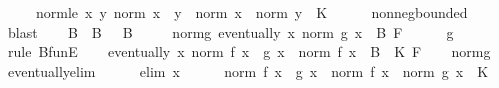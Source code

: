 \begin{isabellebody}
\ \ \ \ \ norm{\isacharunderscore}{\kern0pt}le{\isacharcolon}{\kern0pt}\ {\isachardoublequoteopen}{\isasymAnd}x\ y{\isachardot}{\kern0pt}\ norm\ {\isacharparenleft}{\kern0pt}x\ {\isacharasterisk}{\kern0pt}{\isacharasterisk}{\kern0pt}\ y{\isacharparenright}{\kern0pt}\ {\isasymle}\ norm\ x\ {\isacharasterisk}{\kern0pt}\ norm\ y\ {\isacharasterisk}{\kern0pt}\ K{\isachardoublequoteclose}\isanewline
\ \ \ \ \isamarkupfalse%
\ nonneg{\isacharunderscore}{\kern0pt}bounded\ \isamarkupfalse%
\ blast\isanewline
\ \ \isamarkupfalse%
\ B\ \ B{\isacharcolon}{\kern0pt}\ {\isachardoublequoteopen}{}\ {\isacharless}{\kern0pt}\ B{\isachardoublequoteclose}\isanewline
\ \ \ \ \ norm{\isacharunderscore}{\kern0pt}g{\isacharcolon}{\kern0pt}\ {\isachardoublequoteopen}eventually\ {\isacharparenleft}{\kern0pt}{\isasymlambda}x{\isachardot}{\kern0pt}\ norm\ {\isacharparenleft}{\kern0pt}g\ x{\isacharparenright}{\kern0pt}\ {\isasymle}\ B{\isacharparenright}{\kern0pt}\ F{\isachardoublequoteclose}\isanewline
\ \ \ \ \isamarkupfalse%
\ g\ \isamarkupfalse%
\ {\isacharparenleft}{\kern0pt}rule\ BfunE{\isacharparenright}{\kern0pt}\isanewline
\ \ \isamarkupfalse%
\ {\isachardoublequoteopen}eventually\ {\isacharparenleft}{\kern0pt}{\isasymlambda}x{\isachardot}{\kern0pt}\ norm\ {\isacharparenleft}{\kern0pt}f\ x\ {\isacharasterisk}{\kern0pt}{\isacharasterisk}{\kern0pt}\ g\ x{\isacharparenright}{\kern0pt}\ {\isasymle}\ norm\ {\isacharparenleft}{\kern0pt}f\ x{\isacharparenright}{\kern0pt}\ {\isacharasterisk}{\kern0pt}\ {\isacharparenleft}{\kern0pt}B\ {\isacharasterisk}{\kern0pt}\ K{\isacharparenright}{\kern0pt}{\isacharparenright}{\kern0pt}\ F{\isachardoublequoteclose}\isanewline
\ \ \isamarkupfalse%
\ norm{\isacharunderscore}{\kern0pt}g\ \isamarkupfalse%
\ eventually{\isacharunderscore}{\kern0pt}elim\isanewline
\ \ \ \ \isamarkupfalse%
\ {\isacharparenleft}{\kern0pt}elim\ x{\isacharparenright}{\kern0pt}\isanewline
\ \ \ \ \isamarkupfalse%
\ {\isachardoublequoteopen}norm\ {\isacharparenleft}{\kern0pt}f\ x\ {\isacharasterisk}{\kern0pt}{\isacharasterisk}{\kern0pt}\ g\ x{\isacharparenright}{\kern0pt}\ {\isasymle}\ norm\ {\isacharparenleft}{\kern0pt}f\ x{\isacharparenright}{\kern0pt}\ {\isacharasterisk}{\kern0pt}\ norm\ {\isacharparenleft}{\kern0pt}g\ x{\isacharparenright}{\kern0pt}\ {\isacharasterisk}{\kern0pt}\ K{\isachardoublequoteclose}\isanewline
\ \ \ \ \ \ \isamarkupfalse%

\end{isabellebody}
